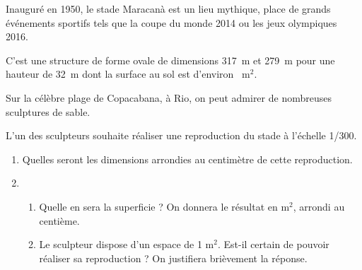 
\medskip

Inauguré en 1950, le stade Maracanà est un lieu
mythique, place de grands événements sportifs tels que
la coupe du monde 2014 ou les jeux olympiques 2016.

C'est une structure de forme ovale de dimensions 317~m
et 279~m pour une hauteur de 32~m dont la surface au sol
est d'environ ~m$^2$.

Sur la célèbre plage de Copacabana, à Rio, on peut admirer de nombreuses sculptures de
sable.

L'un des sculpteurs souhaite réaliser une reproduction du stade à l'échelle 1/300.

\medskip

\begin{enumerate}
\item Quelles seront les dimensions arrondies au centimètre de cette reproduction.
\item  
	\begin{enumerate}
		\item Quelle en sera la superficie ? On donnera le résultat en m$^2$, arrondi au centième.
		\item Le sculpteur dispose d'un espace de 1 m$^2$. Est-il certain de pouvoir réaliser sa
reproduction ? On justifiera brièvement la réponse.
	\end{enumerate}
\end{enumerate}

\vspace{0,5cm}

